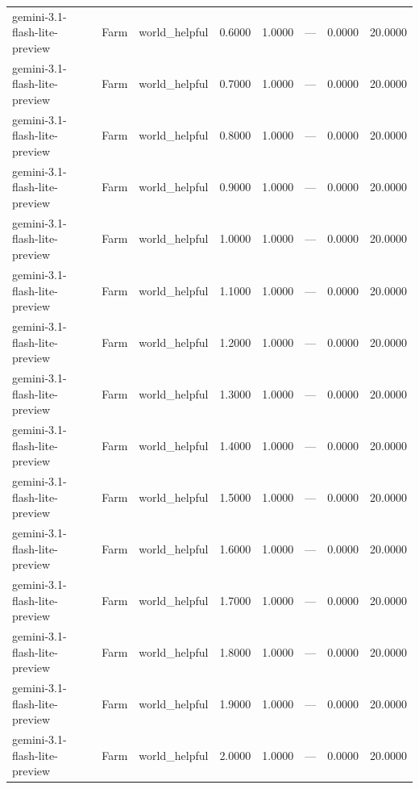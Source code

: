 \begin{table}
\begin{tabular}{llllrrrr}
gemini-3.1-flash-lite-preview & Farm & world_helpful & 0.6000 & 1.0000 & --- & 0.0000 & 20.0000 \\
gemini-3.1-flash-lite-preview & Farm & world_helpful & 0.7000 & 1.0000 & --- & 0.0000 & 20.0000 \\
gemini-3.1-flash-lite-preview & Farm & world_helpful & 0.8000 & 1.0000 & --- & 0.0000 & 20.0000 \\
gemini-3.1-flash-lite-preview & Farm & world_helpful & 0.9000 & 1.0000 & --- & 0.0000 & 20.0000 \\
gemini-3.1-flash-lite-preview & Farm & world_helpful & 1.0000 & 1.0000 & --- & 0.0000 & 20.0000 \\
gemini-3.1-flash-lite-preview & Farm & world_helpful & 1.1000 & 1.0000 & --- & 0.0000 & 20.0000 \\
gemini-3.1-flash-lite-preview & Farm & world_helpful & 1.2000 & 1.0000 & --- & 0.0000 & 20.0000 \\
gemini-3.1-flash-lite-preview & Farm & world_helpful & 1.3000 & 1.0000 & --- & 0.0000 & 20.0000 \\
gemini-3.1-flash-lite-preview & Farm & world_helpful & 1.4000 & 1.0000 & --- & 0.0000 & 20.0000 \\
gemini-3.1-flash-lite-preview & Farm & world_helpful & 1.5000 & 1.0000 & --- & 0.0000 & 20.0000 \\
gemini-3.1-flash-lite-preview & Farm & world_helpful & 1.6000 & 1.0000 & --- & 0.0000 & 20.0000 \\
gemini-3.1-flash-lite-preview & Farm & world_helpful & 1.7000 & 1.0000 & --- & 0.0000 & 20.0000 \\
gemini-3.1-flash-lite-preview & Farm & world_helpful & 1.8000 & 1.0000 & --- & 0.0000 & 20.0000 \\
gemini-3.1-flash-lite-preview & Farm & world_helpful & 1.9000 & 1.0000 & --- & 0.0000 & 20.0000 \\
gemini-3.1-flash-lite-preview & Farm & world_helpful & 2.0000 & 1.0000 & --- & 0.0000 & 20.0000 \\
\bottomrule
\end{tabular}
\end{table}
